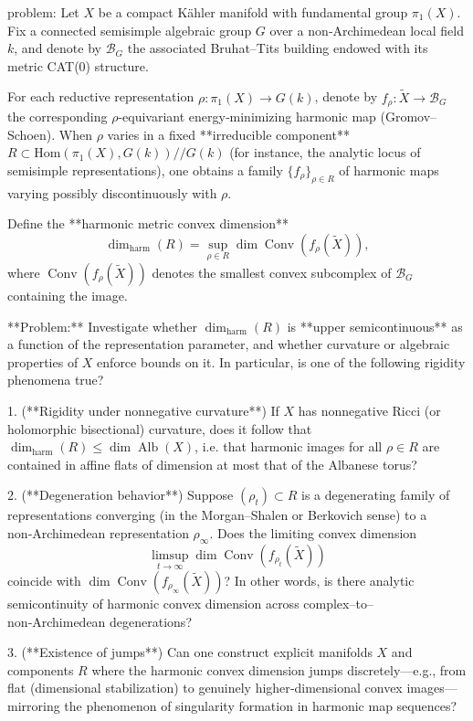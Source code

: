 problem:  
Let \(X\) be a compact Kähler manifold with fundamental group \(\pi_1(X)\). Fix a connected semisimple algebraic group \(G\) over a non‑Archimedean local field \(k\), and denote by \(\mathscr{B}_G\) the associated Bruhat–Tits building endowed with its metric CAT(0) structure.  

For each reductive representation \(\rho: \pi_1(X)\to G(k)\), denote by \(f_\rho: \widetilde{X} \to \mathscr{B}_G\) the corresponding \(\rho\)-equivariant energy‑minimizing harmonic map (Gromov–Schoen). When \(\rho\) varies in a fixed **irreducible component** \(R \subset \mathrm{Hom}(\pi_1(X),G(k))//G(k)\) (for instance, the analytic locus of semisimple representations), one obtains a family \(\{f_\rho\}_{\rho\in R}\) of harmonic maps varying possibly discontinuously with \(\rho\).  

Define the **harmonic metric convex dimension**
\[
\dim_{\mathrm{harm}}(R) = \sup_{\rho\in R} \dim \operatorname{Conv}(f_\rho(\widetilde{X})) ,
\]
where \(\operatorname{Conv}(f_\rho(\widetilde{X}))\) denotes the smallest convex subcomplex of \(\mathscr{B}_G\) containing the image.

**Problem:**  
Investigate whether \(\dim_{\mathrm{harm}}(R)\) is **upper semicontinuous** as a function of the representation parameter, and whether curvature or algebraic properties of \(X\) enforce bounds on it.  In particular, is one of the following rigidity phenomena true?

1. (**Rigidity under nonnegative curvature**)  
   If \(X\) has nonnegative Ricci (or holomorphic bisectional) curvature, does it follow that \(\dim_{\mathrm{harm}}(R)\leq \dim \operatorname{Alb}(X)\), i.e. that harmonic images for all \(\rho\in R\) are contained in affine flats of dimension at most that of the Albanese torus?

2. (**Degeneration behavior**)  
   Suppose \((\rho_t)\subset R\) is a degenerating family of representations converging (in the Morgan–Shalen or Berkovich sense) to a non‑Archimedean representation \(\rho_\infty\). Does the limiting convex dimension  
   \[
   \limsup_{t\to\infty} \dim \operatorname{Conv}(f_{\rho_t}(\widetilde{X}))
   \]
   coincide with \(\dim \operatorname{Conv}(f_{\rho_\infty}(\widetilde{X}))\)?  
   In other words, is there analytic semicontinuity of harmonic convex dimension across complex–to–non‑Archimedean degenerations?

3. (**Existence of jumps**)  
   Can one construct explicit manifolds \(X\) and components \(R\) where the harmonic convex dimension jumps discretely—e.g., from flat (dimensional stabilization) to genuinely higher‑dimensional convex images—mirroring the phenomenon of singularity formation in harmonic map sequences?

